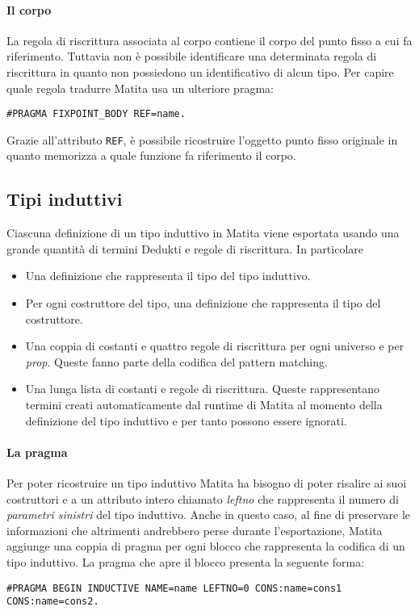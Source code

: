 \documentclass[12pt,a4paper]{mimosis}
\begin{document}
\paragraph{Il corpo}
La regola di riscrittura associata al corpo contiene il corpo del punto fisso
a cui fa riferimento. Tuttavia non è possibile identificare una determinata
regola di riscrittura in quanto non possiedono un identificativo di alcun 
tipo. Per capire quale regola tradurre Matita usa un ulteriore pragma:
\begin{center}
  \texttt{\#PRAGMA FIXPOINT\_BODY REF=name.}
\end{center}

Grazie all'attributo \texttt{REF}, è possibile ricostruire l'oggetto punto fisso originale
in quanto memorizza a quale funzione fa riferimento il corpo.

\subsection{Tipi induttivi}\label{sottoSezioneTipiInduttivi}
Ciascuna definizione di un tipo induttivo in Matita viene esportata usando
una grande quantità di termini Dedukti e regole di riscrittura. In particolare
\begin{itemize}
  \item Una definizione che rappresenta il tipo del tipo induttivo.
  \item Per ogni costruttore del tipo, una definizione che rappresenta il
    tipo del costruttore.
  \item Una coppia di costanti e quattro regole di riscrittura per ogni universo
    e per \textit{prop}. Queste fanno parte della codifica del pattern matching.
  \item Una lunga lista di costanti e regole di riscrittura. Queste rappresentano
    termini creati automaticamente dal runtime di Matita al momento della
    definizione del tipo induttivo e per tanto possono essere ignorati.
\end{itemize}

\paragraph{La pragma}
Per poter ricostruire un tipo induttivo Matita ha bisogno di poter risalire
ai suoi costruttori e a un attributo intero chiamato \textit{leftno} che 
rappresenta il numero di \textit{parametri sinistri} del tipo induttivo.
Anche in questo caso, al fine di preservare le informazioni che altrimenti
andrebbero perse durante l'esportazione, Matita aggiunge una coppia di pragma
per ogni blocco che rappresenta la codifica di un tipo induttivo.
La pragma che apre il blocco presenta la seguente forma:
\begin{center}
  \texttt{\#PRAGMA BEGIN INDUCTIVE NAME=name LEFTNO=0 CONS:name=cons1 CONS:name=cons2.}
\end{center}
\end{document}
